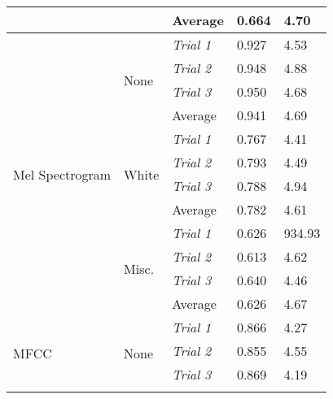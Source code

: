 \begin{longtable}{@{}lllll@{}}
    \multicolumn{1}{l|}{} &
      \multicolumn{1}{l|}{} &
      Average &
      0.664 &
      4.70 \\* \midrule
    \multicolumn{1}{l|}{\multirow{12}{*}{Mel Spectrogram}} &
      \multicolumn{1}{l|}{\multirow{4}{*}{None}} &
      \textit{Trial 1} &
      0.927 &
      4.53 \\
    \multicolumn{1}{l|}{} &
      \multicolumn{1}{l|}{} &
      \textit{Trial 2} &
      0.948 &
      4.88 \\
    \multicolumn{1}{l|}{} &
      \multicolumn{1}{l|}{} &
      \textit{Trial 3} &
      0.950 &
      4.68 \\
    \multicolumn{1}{l|}{} &
      \multicolumn{1}{l|}{} &
      Average &
      0.941 &
      4.69 \\
    \multicolumn{1}{l|}{} &
      \multicolumn{1}{l|}{\multirow{4}{*}{White}} &
      \textit{Trial 1} &
      0.767 &
      4.41 \\
    \multicolumn{1}{l|}{} &
      \multicolumn{1}{l|}{} &
      \textit{Trial 2} &
      0.793 &
      4.49 \\
    \multicolumn{1}{l|}{} &
      \multicolumn{1}{l|}{} &
      \textit{Trial 3} &
      0.788 &
      4.94 \\
    \multicolumn{1}{l|}{} &
      \multicolumn{1}{l|}{} &
      Average &
      0.782 &
      4.61 \\
    \multicolumn{1}{l|}{} &
      \multicolumn{1}{l|}{\multirow{4}{*}{Misc.}} &
      \textit{Trial 1} &
      0.626 &
      934.93 \\
    \multicolumn{1}{l|}{} &
      \multicolumn{1}{l|}{} &
      \textit{Trial 2} &
      0.613 &
      4.62 \\
    \multicolumn{1}{l|}{} &
      \multicolumn{1}{l|}{} &
      \textit{Trial 3} &
      0.640 &
      4.46 \\
    \multicolumn{1}{l|}{} &
      \multicolumn{1}{l|}{} &
      Average &
      0.626 &
      4.67 \\* \midrule
    \multicolumn{1}{l|}{\multirow{12}{*}{MFCC}} &
      \multicolumn{1}{l|}{\multirow{4}{*}{None}} &
      \textit{Trial 1} &
      0.866 &
      4.27 \\
    \multicolumn{1}{l|}{} &
      \multicolumn{1}{l|}{} &
      \textit{Trial 2} &
      0.855 &
      4.55 \\
    \multicolumn{1}{l|}{} &
      \multicolumn{1}{l|}{} &
      \textit{Trial 3} &
      0.869 &
      4.19 \\
    \multicolumn{1}{l|}{} &
      \multicolumn{1}{l|}{} &

\end{longtable}
